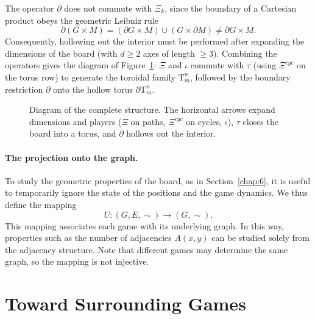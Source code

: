The operator $\partial$ does not commute with $\Xi_k$, since the boundary of a Cartesian product obeys the geometric Leibniz rule
\[
\partial(G \times M) = (\partial G \times M) \cup (G \times \partial M) \neq \partial G \times M.
\]
Consequently, hollowing out the interior must be performed after expanding the dimensions of the board (with $d\ge2$ axes of length $\ge3$). Combining the operators gives the diagram of Figure~\ref{fig:hollow_torus}: $\Xi$ and $\iota$ commute with $\tau$ (using $\Xi^{cyc}$ on the torus row) to generate the toroidal family $\mathrm{T}^n_m$, followed by the boundary restriction $\partial$ onto the hollow torus $\partial\mathrm{T}^n_m$.
\begin{figure}[ht]
	\centering
	\caption{Diagram of the complete structure. The horizontal arrows expand dimensions and players ($\Xi$ on paths, $\Xi^{cyc}$ on cycles, $\iota$), $\tau$ closes the board into a torus, and $\partial$ hollows out the interior.}
	\label{fig:hollow_torus}
\end{figure}

\paragraph{The projection onto the graph.} To study the geometric properties of the board, as in Section~\ref{chap:6}, it is useful to temporarily ignore the state of the positions and the game dynamics. We thus define the mapping
\[U:(G,E,\sim)\to (G,\sim).\]
This mapping associates each game with its underlying graph. In this way, properties such as the number of adjacencies $A(x,y)$ can be studied solely from the adjacency structure. Note that different games may determine the same graph, so the mapping is not injective.

\newpage

\section{Toward Surrounding Games}\label{sec_JR}

